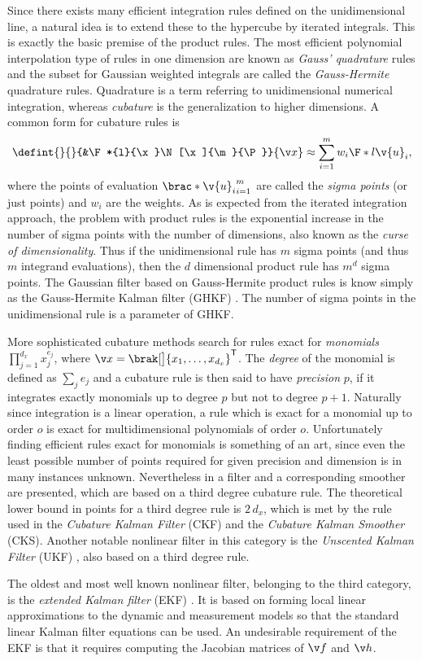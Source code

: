 Since there exists many efficient integration rules defined on the unidimensional line,
a natural idea is to extend these to the hypercube by iterated integrals. This is exactly the 
basic premise of the product rules. The most efficient polynomial interpolation type of rules
in one dimension are known as \emph{Gauss' quadrature} rules and the subset
for Gaussian weighted integrals are called the \emph{Gauss-Hermite}
quadrature rules. Quadrature is a term referring to unidimensional numerical integration, whereas
\emph{cubature} is the generalization to higher dimensions. A common form for cubature rules is
\begin{align}
	\defint{}{}{&\F*{l}{\x}\N[\x]{\m}{\P}}{\x} \approx \sum_{i=1}^m w_i\F*{l}{\v{u}_i}, 
\end{align}
where the points of evaluation $\brac*{\v{u}_i}_{i=1}^m$ are called the \emph{sigma points}
(or just points) and $w_i$ are the weights. As is expected from the iterated integration approach,
the problem with product rules is the exponential increase in the number of sigma points with
the number of dimensions, also known as the \emph{curse of dimensionality}. Thus if the unidimensional rule has $m$ sigma points (and thus $m$ integrand evaluations),
then the $d$ dimensional product rule has $m^d$ sigma points. The Gaussian filter based
on Gauss-Hermite product rules is know simply as the Gauss-Hermite Kalman filter (GHKF) \parencite{Ito2000}.
The number of sigma points in the unidimensional rule is a parameter of GHKF.

More sophisticated cubature methods search for rules
exact for \emph{monomials} $\prod_{j=1}^{d_x} x_j^{e_j}$, where $\x=\brak[\big]{x_1,\dots,x_{d_x}}^\tr$. 
The \emph{degree} of the monomial is defined as $\sum_j e_j$ and a cubature rule is then said to have
\emph{precision} $p$, if it integrates exactly monomials up to degree $p$ but not
to degree $p+1$. Naturally since integration is a linear operation, a rule which is exact 
for a monomial up to order $o$ is exact for multidimensional polynomials of order $o$.
Unfortunately finding efficient rules exact for monomials is something of an art, since
even the least possible number of points required for given precision and dimension is in many
instances unknown. Nevertheless in \textcite{Arasaratnam2009,Arasaratnam2011} a filter
and a corresponding smoother are presented, which are based on a third degree 
cubature rule. The theoretical lower bound in points for a third degree rule
is $2\,d_x$, which is met by the rule used in the \emph{Cubature Kalman Filter} (CKF) and
the \emph{Cubature Kalman Smoother} (CKS). Another notable nonlinear filter in this
category is the \emph{Unscented Kalman Filter} (UKF) \textcite{julier1997new,Merwe2004}, also based on a third degree rule.  

The oldest and most well known nonlinear filter, belonging to the third category, is
the \emph{extended Kalman filter} (EKF) \parencite{jazwinski2007stochastic}. 
It is based on forming local linear approximations to the dynamic
and measurement models so that the standard linear Kalman filter equations can be used.
An undesirable requirement of the EKF is that it requires computing
the Jacobian matrices of $\f$ and $\h$.


